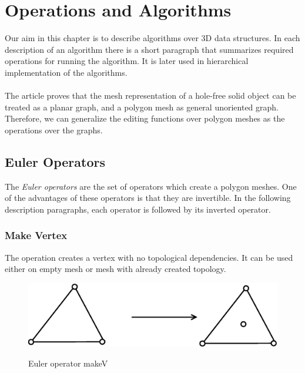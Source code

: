 \chapter{Operations and Algorithms}

\label{chap:op_al}

Our aim in this chapter is to describe algorithms over 3D data structures. In each description of
an algorithm there is a short paragraph that summarizes required operations for running the algorithm.
It is later used in hierarchical implementation of the algorithms.\\
\\
The article\cite{Grunbaum2007} proves that the mesh representation of a hole-free solid object can be
treated as a planar graph, and a polygon mesh as general unoriented graph. Therefore, we can generalize the
editing functions over polygon meshes as the operations over the graphs.\\

\section{Euler Operators}
\label{sec:euler}

The \emph{Euler operators} are the set of operators which create a polygon meshes\cite{Havemann2005}. One of the advantages
of these operators is that they are invertible. In the following description paragraphs,
each operator is followed by its inverted operator.

\subsection{Make Vertex}

The operation creates a vertex with no topological dependencies. It can be used
either on empty mesh or mesh with already created topology.

\begin{figure}[h]
\centering
\includegraphics[scale=0.25]{../img/makeV.eps}
\label{fig:makev}
\caption{Euler operator makeV}
\end{figure}

